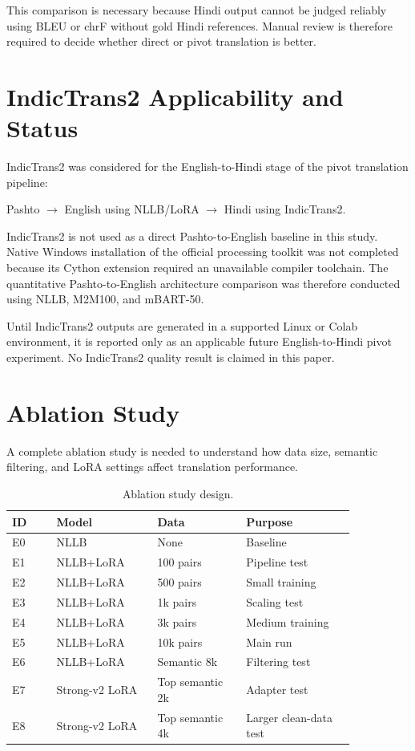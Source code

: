 \documentclass[conference]{IEEEtran}
\begin{document}
This comparison is necessary because Hindi output cannot be judged reliably using BLEU or chrF without gold Hindi references. Manual review is therefore required to decide whether direct or pivot translation is better.

\section{IndicTrans2 Applicability and Status}

IndicTrans2 was considered for the English-to-Hindi stage
of the pivot translation pipeline:

\begin{center}
Pashto $\rightarrow$ English using NLLB/LoRA
$\rightarrow$ Hindi using IndicTrans2.
\end{center}

IndicTrans2 is not used as a direct Pashto-to-English
baseline in this study. Native Windows installation of the
official processing toolkit was not completed because its
Cython extension required an unavailable compiler toolchain.
The quantitative Pashto-to-English architecture comparison
was therefore conducted using NLLB, M2M100, and mBART-50.

Until IndicTrans2 outputs are generated in a supported
Linux or Colab environment, it is reported only as an
applicable future English-to-Hindi pivot experiment.
No IndicTrans2 quality result is claimed in this paper.

\section{Ablation Study}

A complete ablation study is needed to understand how data size, semantic filtering, and LoRA settings affect translation performance.

\begin{table}[H]
\centering
\caption{Ablation study design.}
\footnotesize
\begin{tabular}{p{0.11\linewidth}p{0.25\linewidth}p{0.22\linewidth}p{0.27\linewidth}}
\toprule
\textbf{ID} & \textbf{Model} & \textbf{Data} & \textbf{Purpose} \\
\midrule
E0 & NLLB & None & Baseline \\
E1 & NLLB+LoRA & 100 pairs & Pipeline test \\
E2 & NLLB+LoRA & 500 pairs & Small training \\
E3 & NLLB+LoRA & 1k pairs & Scaling test \\
E4 & NLLB+LoRA & 3k pairs & Medium training \\
E5 & NLLB+LoRA & 10k pairs & Main run \\
E6 & NLLB+LoRA & Semantic 8k & Filtering test \\
E7 & Strong-v2 LoRA & Top semantic 2k & Adapter test \\
E8 & Strong-v2 LoRA & Top semantic 4k & Larger clean-data test \\
\bottomrule
\end{tabular}
\end{table}
\end{document}

